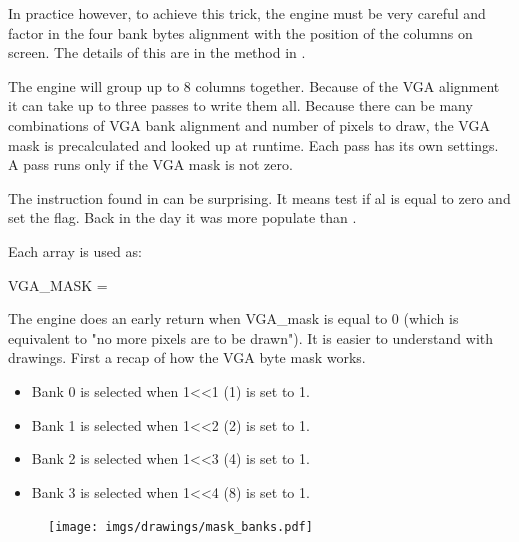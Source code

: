 In practice however, to achieve this trick, the engine must be very careful and factor in the four bank bytes alignment with the position of the columns on screen. The details of this are in the method  in .\\
\par 
\begin{minipage}{\textwidth}

\end{minipage}
The engine will group up to 8 columns together. Because of the VGA alignment it can take up to three passes to write them all. Because there can be many combinations of VGA bank alignment and number of pixels to draw, the VGA mask is precalculated and looked up at runtime. Each pass has its own settings. A pass runs only if the VGA mask is not zero.\\
\par
The instruction  found in  can be surprising. It means test if al is equal to zero and set the flag. Back in the day it was more populate than .\\
 \par
 \begin{minipage}{\textwidth}

\end{minipage}
Each  array is used as:\\
\par
 VGA\_MASK = \\
 \par
 The engine does an early return when VGA\_mask is equal to 0 (which is equivalent to "no more pixels are to be drawn"). It is easier to understand with drawings. First a recap of how the VGA byte mask works.
\begin{itemize}
\item Bank 0 is selected when 1<<1 (1) is set to 1.
\item Bank 1 is selected when 1<<2 (2) is set to 1.
\item Bank 2 is selected when 1<<3 (4) is set to 1.
\item Bank 3 is selected when 1<<4 (8) is set to 1.
\end{itemize}
\par


\begin{figure}[H]
\centering
 \texttt{[image: imgs/drawings/mask\_banks.pdf]}
 \end{figure}


